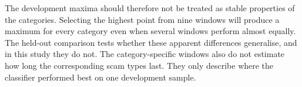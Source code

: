 The development maxima should therefore not be treated as stable properties of
the categories. Selecting the highest point from nine windows will produce a
maximum for every category even when several windows perform almost equally.
The held-out comparison tests whether these apparent differences generalise, and
in this study they do not. The category-specific windows also do not estimate how
long the corresponding scam types last. They only describe where the classifier
performed best on one development sample.

